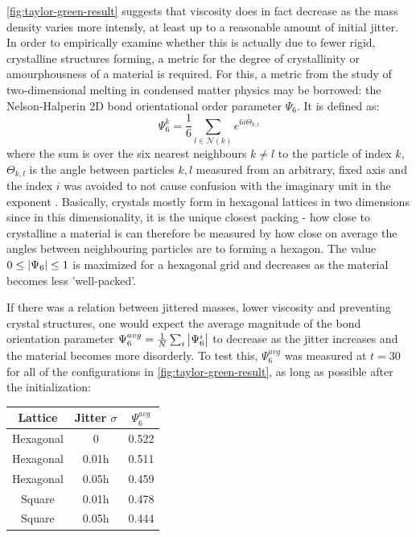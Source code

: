 \begin{samepage}


  \autoref{fig:taylor-green-result} suggests that viscosity does in fact decrease as the mass density varies more intensly, at least up to a reasonable amount of initial jitter.
  In order to empirically examine whether this is actually due to fewer rigid, crystalline structures forming, a metric for the degree of crystallinity or amourphousness of a material is required. For this, a metric from the study of two-dimensional melting in condensed matter physics may be borrowed: the Nelson-Halperin 2D bond orientational order parameter\autocite*{bond-orientational-parameter-pis-6} $\Psi_6$. It is defined as\autocite{nicer-psi-6-bond-orientational}:
  \begin{equation}
    \Psi_6^k = \frac{1}{6} \sum_{l\in\mathcal{N}(k)}e^{6i\Theta_{k,l}}
  \end{equation}
  where the sum is over the six nearest neighbours $k\neq l$ to the particle of index $k$, $\Theta_{k,l}$ is the angle between particles $k,l$ measured from an arbitrary, fixed axis and the index $i$ was avoided to not cause confusion with the imaginary unit in the exponent \autocite*{nicer-psi-6-bond-orientational}. Basically, crystals mostly form in hexagonal lattices in two dimensions since in this dimensionality, it is the unique closest packing - how close to crystalline a material is can therefore be measured by how close on average the angles between neighbouring particles are to forming a hexagon. The value $0 \leq \left|\Psi_6\right| \leq 1$ is maximized for a hexagonal grid and decreases as the material becomes less 'well-packed'\autocite*{nicer-psi-6-bond-orientational}.

  If there was a relation between jittered masses, lower viscosity and preventing crystal structures, one would expect the average magnitude of the bond orientation parameter $\Psi_6^{avg} = \frac{1}{N}\sum_i \left|\Psi_6^i\right|$ to decrease as the jitter increases and the material becomes more disorderly. To test this, $\Psi_6^{avg}$ was measured at $t=30$ for all of the configurations in \autoref{fig:taylor-green-result}, as long as possible after the initialization:

  \begin{center}
    \begin{tabular}{|c | c || c|}
      \hline
      Lattice   & Jitter $\sigma$ & $\Psi_6^{avg}$ \\ [0.5ex]
      \hline\hline
      Hexagonal & 0               & 0.522          \\\hline
      Hexagonal & 0.01h           & 0.511          \\\hline
      Hexagonal & 0.05h           & 0.459          \\\hline
      Square    & 0.01h           & 0.478          \\\hline
      Square    & 0.05h           & 0.444          \\\hline
    \end{tabular}
  \end{center}
\end{samepage}

